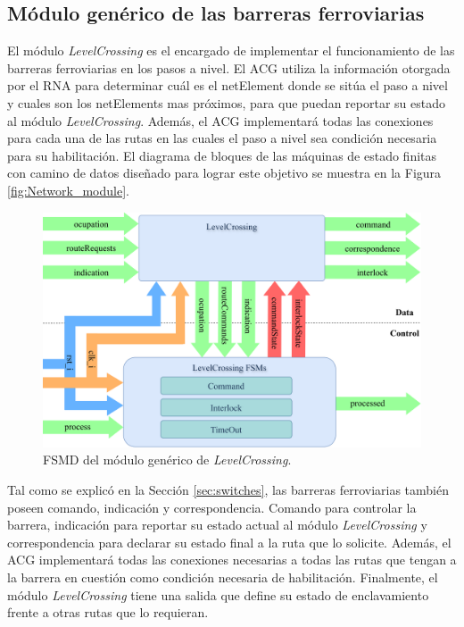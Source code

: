\subsection{Módulo genérico de las barreras ferroviarias}

El módulo \textit{LevelCrossing} es el encargado de implementar el funcionamiento de las barreras ferroviarias en los pasos a nivel. El ACG utiliza la información otorgada por el RNA para determinar cuál es el netElement donde se sitúa el paso a nivel y cuales son los netElements mas próximos, para que puedan reportar su estado al módulo \textit{LevelCrossing}. Además, el ACG implementará todas las conexiones para cada una de las rutas en las cuales el paso a nivel sea condición necesaria para su habilitación. El diagrama de bloques de las máquinas de estado finitas con camino de datos diseñado para lograr este objetivo se muestra en la Figura \ref{fig:Network_module}.

\begin{figure}[H]
	\centering
	\includegraphics[width=1\textwidth]{Figuras/LCB_module}
	\centering\caption{FSMD del módulo genérico de \textit{LevelCrossing}.}
	\label{fig:LCB_module}
\end{figure}

Tal como se explicó en la Sección \ref{sec:switches}, las barreras ferroviarias también poseen comando, indicación y correspondencia. Comando para controlar la barrera, indicación para reportar su estado actual al módulo \textit{LevelCrossing} y correspondencia para declarar su estado final a la ruta que lo solicite. Además, el ACG implementará todas las conexiones necesarias a todas las rutas que tengan a la barrera en cuestión como condición necesaria de habilitación. Finalmente, el módulo \textit{LevelCrossing} tiene una salida que define su estado de enclavamiento frente a otras rutas que lo requieran.

